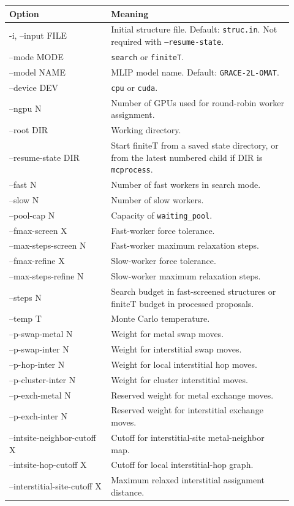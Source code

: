 \documentclass[11pt]{article}
\begin{document}
\begin{longtable}{>{\ttfamily}p{0.33\linewidth}p{0.59\linewidth}}
\toprule
Option & Meaning \\
\midrule
\endhead
-i, --input FILE & Initial structure file. Default: \texttt{struc.in}. Not required with \texttt{--resume-state}. \\
--mode MODE & \texttt{search} or \texttt{finiteT}. \\
--model NAME & MLIP model name. Default: \texttt{GRACE-2L-OMAT}. \\
--device DEV & \texttt{cpu} or \texttt{cuda}. \\
--ngpu N & Number of GPUs used for round-robin worker assignment. \\
--root DIR & Working directory. \\
--resume-state DIR & Start finiteT from a saved state directory, or from the latest numbered child if DIR is \texttt{mcprocess}. \\
--fast N & Number of fast workers in search mode. \\
--slow N & Number of slow workers. \\
--pool-cap N & Capacity of \texttt{waiting\_pool}. \\
--fmax-screen X & Fast-worker force tolerance. \\
--max-steps-screen N & Fast-worker maximum relaxation steps. \\
--fmax-refine X & Slow-worker force tolerance. \\
--max-steps-refine N & Slow-worker maximum relaxation steps. \\
--steps N & Search budget in fast-screened structures or finiteT budget in processed proposals. \\
--temp T & Monte Carlo temperature. \\
--p-swap-metal N & Weight for metal swap moves. \\
--p-swap-inter N & Weight for interstitial swap moves. \\
--p-hop-inter N & Weight for local interstitial hop moves. \\
--p-cluster-inter N & Weight for cluster interstitial moves. \\
--p-exch-metal N & Reserved weight for metal exchange moves. \\
--p-exch-inter N & Reserved weight for interstitial exchange moves. \\
--intsite-neighbor-cutoff X & Cutoff for interstitial-site metal-neighbor map. \\
--intsite-hop-cutoff X & Cutoff for local interstitial-hop graph. \\
--interstitial-site-cutoff X & Maximum relaxed interstitial assignment distance. \\
\bottomrule
\end{longtable}
\end{document}
